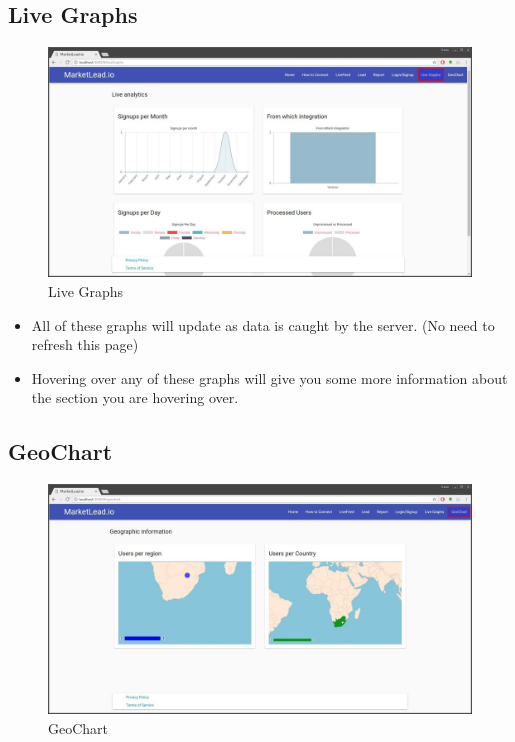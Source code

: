 \documentclass{article}
\begin{document}
		\subsection{Live Graphs}
			\begin{figure}[H]
				\includegraphics[width=\textwidth]{images/live_graph.jpg}
				\caption{Live Graphs}
				\label{fig:liveGraphs}
			\end{figure}

			\begin{itemize}
				\item All of these graphs will update as data is caught by the server. (No need to refresh this page)
				\item Hovering over any of these graphs will give you some more information about the section you are hovering over.
			\end{itemize}

		\subsection{GeoChart}
			\begin{figure}[H]
				\includegraphics[width=\textwidth]{images/geo_chart.jpg}
				\caption{GeoChart}
				\label{fig:geoChart}
			\end{figure}
\end{document}
